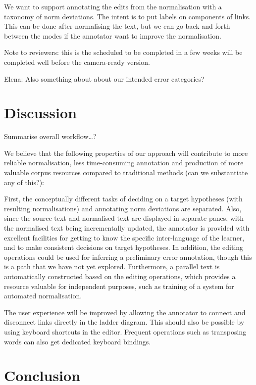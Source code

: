 \documentclass[10pt, a4paper]{article}
\begin{document}
We want to support annotating the edits from the normalisation with a taxonomy
of norm deviations.  The intent is to put labels on components of links.
This can be done after normalising the text, but we can go back and forth
between the modes if the annotator want to improve the normalisation.

Note to reviewers: this is the scheduled to be completed in a few weeks
will be completed well before the camera-ready version.
%

Elena: Also something about about our intended error categories?

\section{Discussion}

Summarise overall workflow\ldots ?

We believe that the following properties of our approach will contribute to more reliable normalisation, less time-consuming annotation and production of more valuable corpus resources compared to traditional methods (can we substantiate any of this?):

First, the conceptually different tasks of deciding on a target hypotheses (with resulting normalisations) and annotating norm deviations are separated. Also, since the source text and normalised text are displayed in separate panes, with the normalised text being incrementally updated, the annotator is provided with excellent facilities for getting to know the specific inter-language of the learner, and to make consistent decisions on target hypotheses. In addition, the editing operations could be used for inferring a preliminary error annotation, though this is a path that we have not yet explored. Furthermore, a parallel text is automatically constructed based on the editing operations, which provides a resource valuable for independent purposes, such as training of a system for automated normalisation.

The user experience will be improved by allowing the annotator to connect
and disconnect links directly in the ladder diagram. This should also be
possible by using keyboard shortcuts in the editor.  Frequent operations
such as transposing words can also get dedicated keyboard bindings.

\section{Conclusion}
\end{document}

